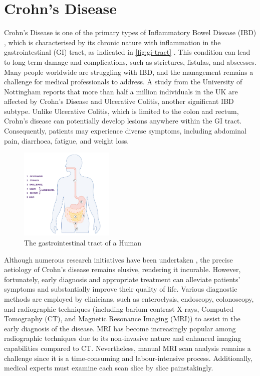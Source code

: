 \section{Crohn's Disease}
Crohn's Disease \cite{baumgart2012crohn,crohnsNHS} is one of the primary types of Inflammatory Bowel Disease (IBD) \cite{IBDCDC}, which is characterised by its chronic nature with inflammation in the gastrointestinal (GI) tract, as indicated in \autoref{fig:gi-tract} \cite{digestio98:online}. This condition can lead to long-term damage and complications, such as strictures, fistulas, and abscesses. Many people worldwide are struggling with IBD, and the management remains a challenge for medical professionals to address. A study from the University of Nottingham \cite{UoNResearch} reports that more than half a million individuals in the UK are affected by Crohn's Disease and Ulcerative Colitis, another significant IBD subtype. Unlike Ulcerative Colitis, which is limited to the colon and rectum, Crohn's disease can potentially develop lesions anywhere within the GI tract. Consequently, patients may experience diverse symptoms, including abdominal pain, diarrhoea, fatigue, and weight loss.
\begin{figure}[htp]
    \centering
    \includegraphics[width=0.4\textwidth]{figures/digestion-graphic.jpg}
    \caption{The gastrointestinal tract of a Human}
    \label{fig:gi-tract}
\end{figure}

Although numerous research initiatives have been undertaken \cite{hoarau2016bacteriome,feuerstein2021aga}, the precise aetiology of Crohn's disease remains elusive, rendering it incurable. However, fortunately, early diagnosis and appropriate treatment can alleviate patients' symptoms and substantially improve their quality of life. Various diagnostic methods are employed by clinicians, such as enteroclysis, endoscopy, colonoscopy, and radiographic techniques (including barium contrast X-rays, Computed Tomography (CT), and Magnetic Resonance Imaging (MRI)) to assist in the early diagnosis of the disease. MRI has become increasingly popular among radiographic techniques due to its non-invasive nature and enhanced imaging capabilities compared to CT. Nevertheless, manual MRI scan analysis remains a challenge since it is a time-consuming and labour-intensive process. Additionally, medical experts must examine each scan slice by slice painstakingly.

